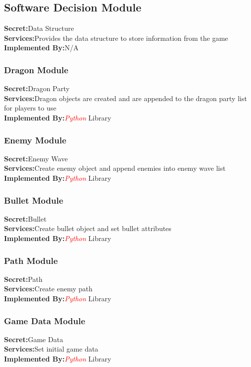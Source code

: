 \documentclass{article}
\begin{document}
\subsection{Software Decision Module}
\textbf{Secret:}Data Structure\\
\textbf{Services:}Provides the data structure to store information from the game\\
\textbf{Implemented By:}N/A\\

\subsubsection{Dragon Module}
\textbf{Secret:}Dragon Party\\
\textbf{Services:}Dragon objects are created and are appended to the dragon party list for players to use\\
\textbf{Implemented By:}\textcolor{red}{\textit{Python}} Library\\

\subsubsection{Enemy Module}
\textbf{Secret:}Enemy Wave\\
\textbf{Services:}Create enemy object and append enemies into enemy wave list\\
\textbf{Implemented By:}\textcolor{red}{\textit{Python}} Library\\

\subsubsection{Bullet Module}
\textbf{Secret:}Bullet\\
\textbf{Services:}Create bullet object and set bullet attributes\\
\textbf{Implemented By:}\textcolor{red}{\textit{Python}} Library\\

\subsubsection{Path Module}
\textbf{Secret:}Path\\
\textbf{Services:}Create enemy path\\
\textbf{Implemented By:}\textcolor{red}{\textit{Python}} Library\\

\subsubsection{Game Data Module}
\textbf{Secret:}Game Data\\
\textbf{Services:}Set initial game data\\
\textbf{Implemented By:}\textcolor{red}{\textit{Python}} Library\\
\end{document}

